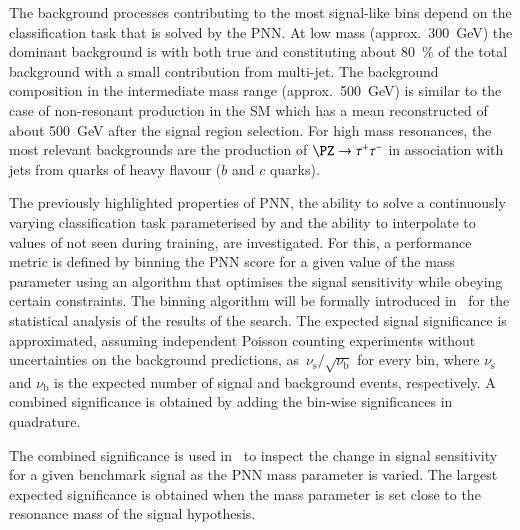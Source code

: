 The background processes contributing to the most signal-like bins
depend on the classification task that is solved by the PNN. At low
mass (approx.\ \SI{300}{\GeV}) the dominant background is \ttbar with
both true and \faketauhadvis constituting about \SI{80}{\percent} of
the total background with a small contribution from multi-jet.  The
background composition in the intermediate mass range (approx.\
\SI{500}{\GeV}) is similar to the case of non-resonant \HH production
in the SM which has a mean reconstructed \mHH of about \SI{500}{\GeV}
after the signal region selection. For high mass resonances, the most
relevant backgrounds are the production of $\PZ \to \tautau$ in
association with jets from quarks of heavy flavour ($b$ and $c$
quarks).

The previously highlighted properties of PNN, the ability to solve a
continuously varying classification task parameterised by \mX and the
ability to interpolate to values of \mX not seen during training, are
investigated. For this, a performance metric is defined by binning the
PNN score for a given value of the mass parameter using an algorithm
that optimises the signal sensitivity while obeying certain
constraints. The binning algorithm will be formally introduced
in~ for the statistical analysis of the results
of the search.
The expected signal significance is approximated, assuming independent
Poisson counting experiments without uncertainties on the background
predictions, as~$\nu_\text{s} / \sqrt{\nu_\text{b}}$ for every bin,
where $\nu_\text{s}$ and $\nu_\text{b}$ is the expected number of
signal and background events, respectively. A combined significance is
obtained by adding the bin-wise significances in quadrature.

The combined significance is used in~ to
inspect the change in signal sensitivity for a given benchmark signal
as the PNN mass parameter is varied. The largest expected significance
is obtained when the mass parameter is set close to the resonance mass
of the signal hypothesis.

